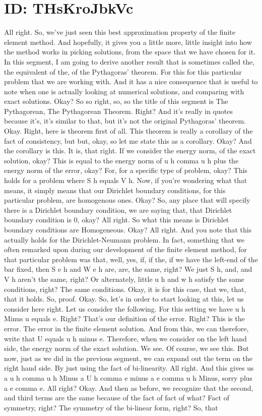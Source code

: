 \documentclass[10pt]{article}
\begin{document}
{\section*{ID: THsKroJbkVc}
All right. So, we've just seen this best approximation property of the finite element method. And hopefully, it gives you a little more, little insight into how the method works in picking solutions, from the space that we have chosen for it.  In this segment, I am going to derive another result that is sometimes called the, the equivalent of the, of the Pythagoras' theorem. For this for this particular problem that we are working with. And it has a nice consequence that is useful to note when one is actually looking at numerical solutions, and comparing with exact solutions. Okay? So so right, so, so the title of this segment is The Pythagorean, The Pythagorean Theorem. Right? And it's really in quotes because it's, it's similar to that, but it's not the original Pythagoras' theorem. Okay. Right, here is theorem first of all. This theorem is really a corollary of the fact of consistency, but but, okay, so let me state this as a corollary. Okay? And the corollary is this. It is, that right. If we consider the energy norm, of the exact solution, okay? This is equal to the energy norm of u h comma u h plus the energy norm of the error, okay? For, for a specific type of problem, okay? This holds for a problem where S h equals V h. Now, if you're wondering what that means, it simply means that our Dirichlet boundary conditions, for this particular problem, are homogenous ones. Okay? So, any place that will specify there is a Dirichlet boundary condition, we are saying that, that Dirichlet boundary condition is 0, okay? All right. So what this means is Dirichlet boundary conditions are Homogeneous. Okay? All right. And you note that this actually holds for the Dirichlet-Neumann problem. In fact, something that we often remarked upon during our development of the finite element method, for that particular problem was that, well, yes, if, if the, if we have the left-end of the bar fixed, then S e h and W e h are, are, the same, right? We just  S h, and, and V h aren't the same, right? Or alternately, little u h and w h satisfy the same conditions, right? The same  conditions. Okay, it is for this case, that we, that, that it holds. So, proof. Okay. So, let's in order to start looking at this, let us consider here right. Let us consider the following. For this setting we have u h Minus u equals e. Right? That's our definition of the error. Right? This is the error. The error in the finite element solution. And from this, we can therefore, write that U equals u h minus e. Therefore, when we consider on the left hand side, the energy norm of the exact solution. We see. Of course, we see this. But now, just as we did in the previous segment, we can expand out the term on the right hand side. By just using the fact of bi-linearity. All right. And this gives us a u h comma u h Minus a U h comma e minus a e comma u h Minus, sorry plus a e comma e. All right? Okay. And then as before, we recognize that the second, and third terms are the same because of the fact of fact of what? Fact of symmetry, right? The symmetry of the bi-linear form, right? So, that }
\end{document}
